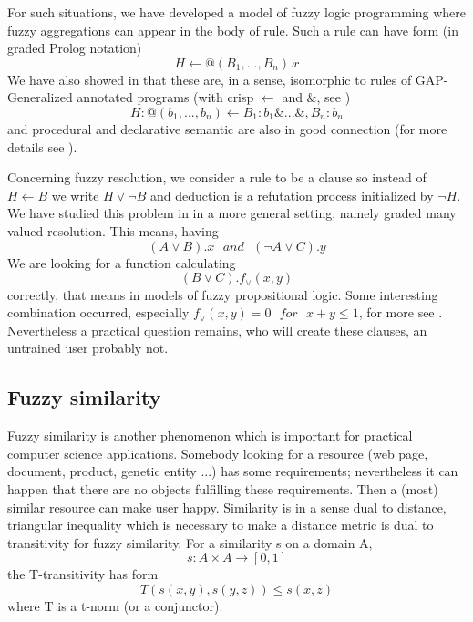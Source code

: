      For such situations, we have developed a model of fuzzy logic programming where fuzzy aggregations can appear in the body of rule. Such a rule can have form (in graded Prolog notation)
\begin{displaymath}
H\leftarrow @(B_1,...,B_n).r	
\end{displaymath}
We have also showed in \cite{16} that these are, in a sense, isomorphic to rules of GAP-Generalized annotated programs (with crisp $\leftarrow$ and \&, see \cite{KS})
\begin{displaymath}
H:@(b_1,...,b_n)\leftarrow B_1:b_1\&...\&,B_n:b_n	
\end{displaymath} 
and procedural and declarative semantic are also in good connection (for more details see \cite{16}). 


     Concerning fuzzy resolution, we consider a rule to be a clause so instead of $H \leftarrow B$ we write $H \vee \neg B$ and deduction is a refutation process initialized by $\neg H$. We have studied this problem in \cite{17} in a more general setting, namely graded many valued resolution. This means, having
\begin{displaymath}
(A \vee B).x \ \ \  and \ \ \  (\neg A \vee C).y
\end{displaymath}
We are looking for a function calculating 
\begin{displaymath}
(B \vee C).f_{\vee}(x,y)
\end{displaymath}
correctly, that means in models of fuzzy propositional logic. Some interesting combination occurred, especially $f_{\vee}(x,y)=0 \ \ \  for \ \ \  x+y \leq 1$, for more see \cite{17}. Nevertheless a practical question remains, who will create these clauses, an untrained user probably not. 

\subsection{Fuzzy similarity}

Fuzzy similarity is another phenomenon which is important for practical computer science applications. Somebody looking for a resource (web page, document, product, genetic entity ...) has some requirements; nevertheless it can happen that there are no objects fulfilling these requirements. Then a (most) similar resource can make user happy. Similarity is in a sense dual to distance, triangular inequality which is necessary to make a distance metric is dual to transitivity for fuzzy similarity. For a similarity s on a domain A,
\begin{displaymath}
s:A \times A \rightarrow [0,1]
\end{displaymath}
the T-transitivity has form 
\begin{displaymath}
T(s(x,y),s(y,z)) \leq s(x,z)
\end{displaymath}
where T is a t-norm (or a conjunctor).

